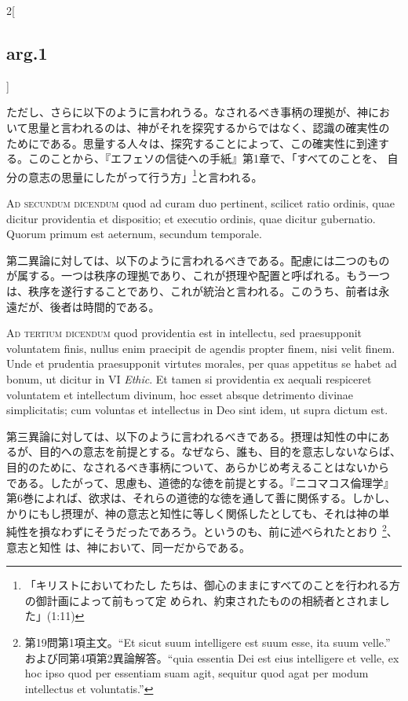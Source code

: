\documentclass[paper=a4paper,fontsize=10pt,jafontsize=9pt,titlepage]{jlreq}
\begin{document}
\begin{paracol}{2}[\subsection{arg.1}]
\switchcolumn

ただし、さらに以下のように言われうる。なされるべき事柄の理拠が、神にお
いて思量と言われるのは、神がそれを探究するからではなく、認識の確実性の
ためにである。思量する人々は、探究することによって、この確実性に到達す
る。このことから、『エフェソの信徒への手紙』第1章で、「すべてのことを、
自分の意志の思量にしたがって行う方」\footnote{「キリストにおいてわたし
たちは、御心のままにすべてのことを行われる方の御計画によって前もって定
められ、約束されたものの相続者とされました」(1:11)}と言われる。

\switchcolumn*[\subsection{ad.2}]

{\scshape Ad secundum dicendum} quod ad curam duo
pertinent, scilicet ratio ordinis, quae dicitur providentia et
dispositio; et executio ordinis, quae dicitur gubernatio. Quorum primum
est aeternum, secundum temporale.

\switchcolumn

第二異論に対しては、以下のように言われるべきである。配慮には二つのもの
が属する。一つは秩序の理拠であり、これが摂理や配置と呼ばれる。もう一つ
は、秩序を遂行することであり、これが統治と言われる。このうち、前者は永
遠だが、後者は時間的である。

\switchcolumn*[\subsection{ad.3}]

{\scshape Ad tertium dicendum} quod providentia est in
intellectu, sed praesupponit voluntatem finis, nullus enim praecipit de
agendis propter finem, nisi velit finem. Unde et prudentia praesupponit
virtutes morales, per quas appetitus se habet ad bonum, ut dicitur in VI
{\itshape Ethic}. Et tamen si providentia ex aequali respiceret voluntatem et
intellectum divinum, hoc esset absque detrimento divinae simplicitatis;
cum voluntas et intellectus in Deo sint idem, ut supra dictum est.

\switchcolumn

第三異論に対しては、以下のように言われるべきである。摂理は知性の中にあ
るが、目的への意志を前提とする。なぜなら、誰も、目的を意志しないならば、
目的のために、なされるべき事柄について、あらかじめ考えることはないから
である。したがって、思慮も、道徳的な徳を前提とする。『ニコマコス倫理学』
第6巻によれば、欲求は、それらの道徳的な徳を通して善に関係する。しかし、
かりにもし摂理が、神の意志と知性に等しく関係したとしても、それは神の単
純性を損なわずにそうだったであろう。というのも、前に述べられたとおり
\footnote{第19問第1項主文。``Et sicut suum intelligere est suum esse,
ita suum velle.'' および同第4項第2異論解答。``quia essentia Dei est
eius intelligere et velle, ex hoc ipso quod per essentiam suam agit,
sequitur quod agat per modum intellectus et voluntatis.''}、意志と知性
は、神において、同一だからである。

\end{paracol}
\newpage
{}
{}
\setcounter{section}{2}
\setcounter{subsection}{0}
\end{document}
